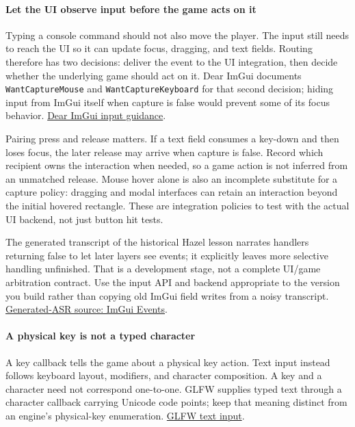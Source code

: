\paragraph{Let the UI observe input before the game acts on it}\label{let-the-ui-observe-input-before-the-game-acts-on-it}

Typing a console command should not also move the player. The input still needs to reach the UI so it can update focus, dragging, and text fields. Routing therefore has two decisions: deliver the event to the UI integration, then decide whether the underlying game should act on it. Dear ImGui documents \texttt{WantCaptureMouse} and \texttt{WantCaptureKeyboard} for that second decision; hiding input from ImGui itself when capture is false would prevent some of its focus behavior. \href{https://github.com/ocornut/imgui/blob/master/docs/FAQ.md\#q-how-can-i-tell-whether-to-dispatch-mousekeyboard-to-dear-imgui-or-my-application}{Dear ImGui input guidance}.

Pairing press and release matters. If a text field consumes a key-down and then loses focus, the later release may arrive when capture is false. Record which recipient owns the interaction when needed, so a game action is not inferred from an unmatched release. Mouse hover alone is also an incomplete substitute for a capture policy: dragging and modal interfaces can retain an interaction beyond the initial hovered rectangle. These are integration policies to test with the actual UI backend, not just button hit tests.

The generated transcript of the historical Hazel lesson narrates handlers returning false to let later layers see events; it explicitly leaves more selective handling unfinished. That is a development stage, not a complete UI/game arbitration contract. Use the input API and backend appropriate to the version you build rather than copying old ImGui field writes from a noisy transcript. \href{https://www.youtube.com/watch?v=yBP1gSbQPPM}{Generated-ASR source: ImGui Events}.

\paragraph{A physical key is not a typed character}\label{a-physical-key-is-not-a-typed-character}

A key callback tells the game about a physical key action. Text input instead follows keyboard layout, modifiers, and character composition. A key and a character need not correspond one-to-one. GLFW supplies typed text through a character callback carrying Unicode code points; keep that meaning distinct from an engine's physical-key enumeration. \href{https://www.glfw.org/docs/latest/input_guide.html\#input_char}{GLFW text input}.

